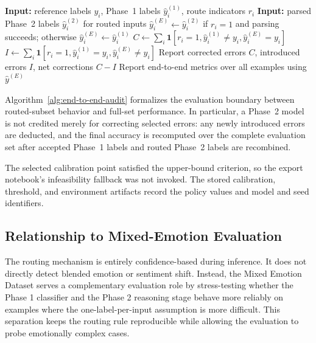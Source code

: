 \documentclass{ieeeaccess}
\begin{document}
\begin{algorithm}[t]
\caption{Audited end-to-end evaluation of routed predictions}
\label{alg:end-to-end-audit}
\footnotesize
\begin{algorithmic}[1]
\State \textbf{Input:} reference labels $y_i$, Phase~1 labels $\hat{y}^{(1)}_i$, route indicators $r_i$
\State \textbf{Input:} parsed Phase~2 labels $\hat{y}^{(2)}_i$ for routed inputs
    \State $\hat{y}^{(E)}_i \gets \hat{y}^{(2)}_i$ if $r_i=1$ and parsing succeeds; otherwise $\hat{y}^{(E)}_i \gets \hat{y}^{(1)}_i$
\EndFor
\State $C\gets\sum_i\mathbf{1}[r_i=1,\hat{y}^{(1)}_i\ne y_i,\hat{y}^{(E)}_i=y_i]$
\State $I\gets\sum_i\mathbf{1}[r_i=1,\hat{y}^{(1)}_i=y_i,\hat{y}^{(E)}_i\ne y_i]$
\State Report corrected errors $C$, introduced errors $I$, net corrections $C-I$
\State Report end-to-end metrics over all examples using $\hat{y}^{(E)}$
\end{algorithmic}
\end{algorithm}

Algorithm~\ref{alg:end-to-end-audit} formalizes the evaluation boundary between routed-subset behavior and full-set performance. In particular, a Phase~2 model is not credited merely for correcting selected errors: any newly introduced errors are deducted, and the final accuracy is recomputed over the complete evaluation set after accepted Phase~1 labels and routed Phase~2 labels are recombined.

The selected calibration point satisfied the upper-bound criterion, so the export notebook's infeasibility fallback was not invoked. The stored calibration, threshold, and environment artifacts record the policy values and model and seed identifiers.

\subsection{Relationship to Mixed-Emotion Evaluation}

The routing mechanism is entirely confidence-based during inference. It does not directly detect blended emotion or sentiment shift. Instead, the Mixed Emotion Dataset serves a complementary evaluation role by stress-testing whether the Phase 1 classifier and the Phase 2 reasoning stage behave more reliably on examples where the one-label-per-input assumption is more difficult. This separation keeps the routing rule reproducible while allowing the evaluation to probe emotionally complex cases.
\end{document}
